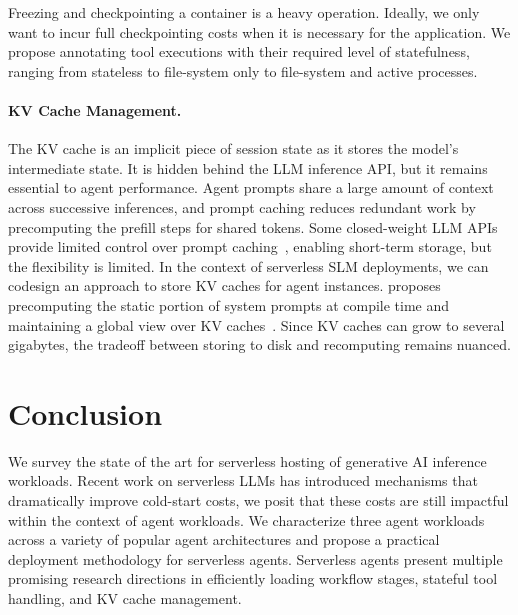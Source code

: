 Freezing and checkpointing a container is a heavy operation.
Ideally, we only want to incur full checkpointing costs when it is necessary for the application.
We propose annotating tool executions with their required level of statefulness, ranging from stateless to file-system only to file-system and active processes.


\paragraph{KV Cache Management.}
The KV cache is an implicit piece of session state as it stores the model's intermediate state. 
It is hidden behind the LLM inference API, but it remains essential to agent performance.
Agent prompts share a large amount of context across successive inferences, and prompt caching reduces redundant work by precomputing the prefill steps for shared tokens.
Some closed-weight LLM APIs provide limited control over prompt caching~\cite{openai_prompt_caching, anthropic_prompt_caching}, enabling short-term storage, but the flexibility is limited.
In the context of serverless SLM deployments, we can codesign an approach to store KV caches for agent instances.
\helium{} proposes precomputing the static portion of system prompts at compile time and maintaining a global view over KV caches~\cite{wadlom2026efficientllmservingagentic}.
Since KV caches can grow to several gigabytes, the tradeoff between storing to disk and recomputing remains nuanced. 

\section{Conclusion}

We survey the state of the art for serverless hosting of generative AI inference workloads.
Recent work on serverless LLMs has introduced mechanisms that dramatically improve cold-start costs, we posit that these costs are still impactful within the context of agent workloads.
We characterize three agent workloads across a variety of popular agent architectures and propose a practical deployment methodology for serverless agents.
Serverless agents present multiple promising research directions in efficiently loading workflow stages, stateful tool handling, and KV cache management.

% 






